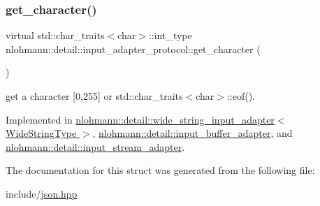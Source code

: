 \subsubsection{\texorpdfstring{get\+\_\+character()}{get\_character()}}
{\footnotesize\ttfamily virtual std\+::char\+\_\+traits$<$char$>$\+::int\+\_\+type nlohmann\+::detail\+::input\+\_\+adapter\+\_\+protocol\+::get\+\_\+character (\begin{DoxyParamCaption}{ }\end{DoxyParamCaption})\hspace{0.3cm}{\ttfamily [pure virtual]}}



get a character \mbox{[}0,255\mbox{]} or std\+::char\+\_\+traits$<$char$>$\+::eof(). 



Implemented in \hyperlink{classnlohmann_1_1detail_1_1wide__string__input__adapter_abb62b34cf77e557ce5321b7f2490c3b0}{nlohmann\+::detail\+::wide\+\_\+string\+\_\+input\+\_\+adapter$<$ Wide\+String\+Type $>$}, \hyperlink{classnlohmann_1_1detail_1_1input__buffer__adapter_ae9e195b04f3551fafb0925aafba00124}{nlohmann\+::detail\+::input\+\_\+buffer\+\_\+adapter}, and \hyperlink{classnlohmann_1_1detail_1_1input__stream__adapter_ae0760af923583de6354725e901d1869d}{nlohmann\+::detail\+::input\+\_\+stream\+\_\+adapter}.



The documentation for this struct was generated from the following file\+:\begin{DoxyCompactItemize}
\item 
include/\hyperlink{json_8hpp}{json.\+hpp}\end{DoxyCompactItemize}
